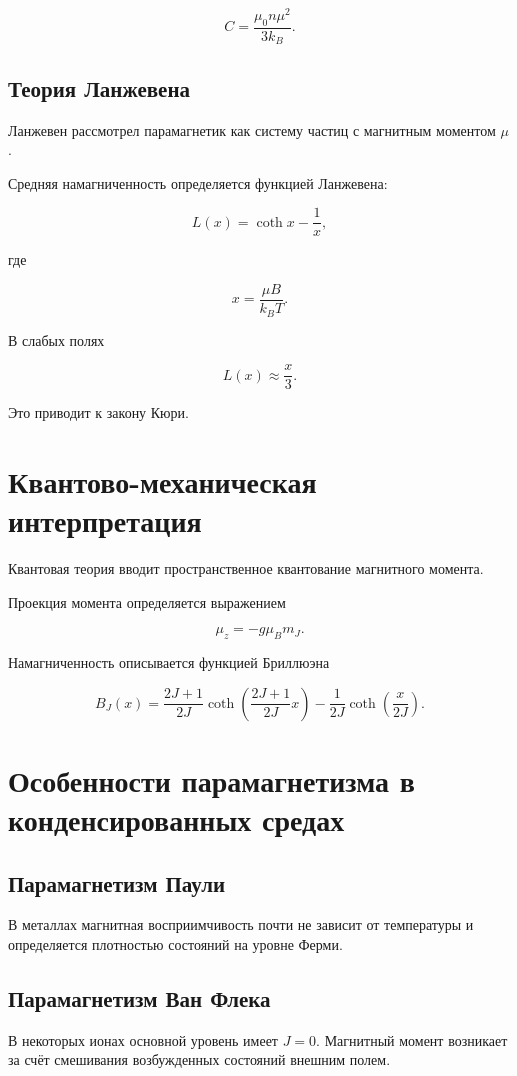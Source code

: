 \documentclass[a4paper,14pt]{extarticle}
\begin{document}
\[
C = \frac{\mu_0 n \mu^2}{3k_B}.
\]

\subsection{Теория Ланжевена}

Ланжевен рассмотрел парамагнетик как систему частиц с магнитным моментом $\mu$.

Средняя намагниченность определяется функцией Ланжевена:

\[
L(x)=\coth x - \frac{1}{x},
\]

где

\[
x=\frac{\mu B}{k_B T}.
\]

В слабых полях

\[
L(x)\approx \frac{x}{3}.
\]

Это приводит к закону Кюри.

\section{Квантово-механическая интерпретация}

Квантовая теория вводит пространственное квантование магнитного момента.

Проекция момента определяется выражением

\[
\mu_z = - g \mu_B m_J.
\]

Намагниченность описывается функцией Бриллюэна

\[
B_J(x)=
\frac{2J+1}{2J}\coth\left(\frac{2J+1}{2J}x\right)
-
\frac{1}{2J}\coth\left(\frac{x}{2J}\right).
\]

\section{Особенности парамагнетизма в конденсированных средах}

\subsection{Парамагнетизм Паули}

В металлах магнитная восприимчивость почти не зависит от температуры и определяется плотностью состояний на уровне Ферми.

\subsection{Парамагнетизм Ван Флека}

В некоторых ионах основной уровень имеет $J=0$. Магнитный момент возникает за счёт смешивания возбужденных состояний внешним полем.
\end{document}
